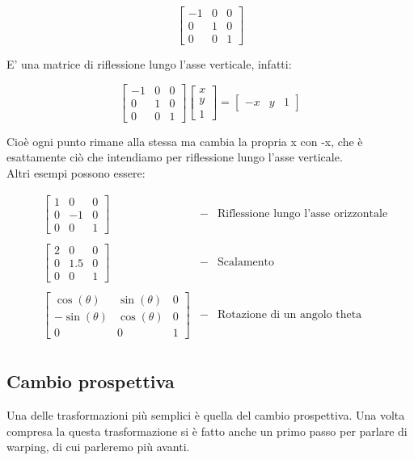 $$
{\begin{bmatrix}
-1&0&0\\
0&1&0\\
0&0&1
\end{bmatrix}}
$$

E' una matrice di riflessione lungo l'asse verticale, infatti: 

$$
{\begin{bmatrix}
-1&0&0\\
0&1&0\\
0&0&1
\end{bmatrix}}
\begin{bmatrix}
x\\y\\1
\end{bmatrix}
=
\begin{bmatrix}
-x&y&1
\end{bmatrix}
$$	
\vspace{1em}

Cioè ogni punto rimane alla stessa ma cambia la propria x con -x, che è esattamente ciò che intendiamo per riflessione lungo l'asse verticale.\\

\newpage
Altri esempi possono essere:

\begin{align*}
&\begin{bmatrix}
1&0&0\\
0&-1&0\\
0&0&1
\end{bmatrix}&-&
\text{Riflessione lungo l'asse orizzontale}\\
\\
&\begin{bmatrix}
2&0&0\\
0&1.5&0\\
0&0&1
\end{bmatrix}&-&
\text{Scalamento}\\
\\
&\begin{bmatrix}
\cos(\theta )&\sin(\theta )&0\\
-\sin(\theta )&\cos(\theta )&0\\
0&0&1
\end{bmatrix}&-&
\text{Rotazione di un angolo theta}\\
\end{align*}



\subsection{Cambio prospettiva}
Una delle trasformazioni più semplici è quella del cambio prospettiva. Una volta compresa la questa trasformazione si è fatto anche un primo passo per parlare di warping, di cui parleremo più avanti.\\

